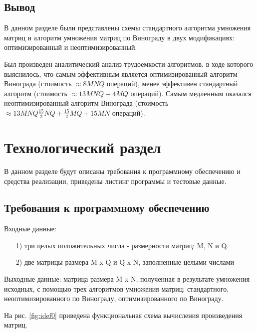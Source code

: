 \documentclass[a4paper,12pt]{article}
\begin{document}
	\subsection*{Вывод}
		В данном разделе были представлены схемы стандартного алгоритма умножения матриц и алгоритм умножения матриц по Винограду в двух модификациях: оптимизированный и неоптимизированный.
		
		Был произведен аналитический анализ трудоемкости алгоритмов, в ходе которого выяснилось, что самым эффективным является оптимизированный алгоритм Винограда (стоимость $\approx8MNQ$ операций), менее эффективен стандартный алгоритм (стоимость $\approx13MNQ + 4MQ$ операций). Самым медленным оказался неоптимизированный алгоритм Винограда (стоимость $\approx13MNQ\frac{15}{2}NQ + \frac{15}{2}MQ  + 15MN$ операций).



  
\pagebreak
\newpage         

\section{Технологический раздел}

	В данном разделе будут описаны требования к программному обеспечению и средства реализации, приведены листинг программы и тестовые данные.
	\subsection{Требования к программному обеспечению}
	Входные данные: 
	 \begin{enumerate} 
	 \item[1)] три целых положительных числа - размерности матриц: M, N и Q.
	 \item[2)] две матрицы размера M x Q и Q x N, заполненные целыми числами
	 \end{enumerate}
	
	Выходные данные: матрица размера M x N, полученная в результате умножения исходных, с помощью трех алгоритмов умножения матриц: стандартного, неоптимизированного по Винограду, оптимизированного по Винограду.
	
	На рис. \ref{fig:idef0} приведена функциональная схема вычисления произведения матриц.
        
\end{document}

